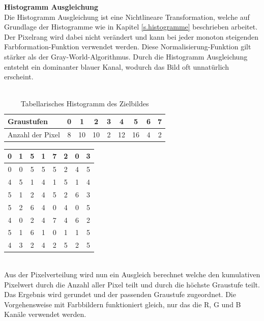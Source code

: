 \documentclass[a4paper,12pt,oneside]{article}
\begin{document}
\textbf{Histogramm Ausgleichung}\label{s.ha}\\
Die Histogramm Ausgleichung ist eine Nichtlineare Transformation, welche auf Grundlage der Histogramme wie in Kapitel \ref{s.histogramme} beschrieben arbeitet. Der Pixelrang wird dabei nicht verändert und kann bei jeder monoton steigenden Farbformation-Funktion verwendet werden. Diese Normalisierung-Funktion gilt stärker als der Gray-World-Algorithmus. Durch die Histogramm Ausgleichung entsteht ein dominanter blauer Kanal, wodurch das Bild oft unnatürlich erscheint.\\\\
\begin{table}
[h]
\caption{Tabellarisches Histogramm des Zielbildes}
\centering
\begin{tabular}{|l|c|c|c|c|c|c|c|c|}
\hline
Graustufen & 0 & 1 & 2 & 3 & 4 & 5 & 6 & 7\\
\hline
Anzahl der Pixel & 8 & 10 & 10 & 2 & 12 & 16 & 4 & 2\\
\hline
\end{tabular}
\end{table}
\begin{table}
[h]
\centering
\begin{tabular}{|c|c|c|c|c|c|c|c|}
\hline
0&1&5&1&7&2&0&3\\
\hline
0&0&5&5&5&2&4&5\\
\hline
4&5&1&4&1&5&1&4\\
\hline
5&1&2&4&5&2&6&3\\
\hline
5&2&6&4&0&4&0&5\\
\hline
4&0&2&4&7&4&6&2\\
\hline
5&1&6&1&0&1&1&5\\
\hline
4&3&2&4&2&5&2&5\\
\hline
\end{tabular}
\end{table}\\
Aus der Pixelverteilung wird nun ein Ausgleich berechnet welche den kumulativen Pixelwert durch die Anzahl aller Pixel teilt und durch die höchste Graustufe teilt. Das Ergebnis wird gerundet und der passenden Graustufe zugeordnet. Die Vorgehensweise mit Farbbildern funktioniert gleich, nur das die R, G und B Kanäle verwendet werden.
\end{document}

